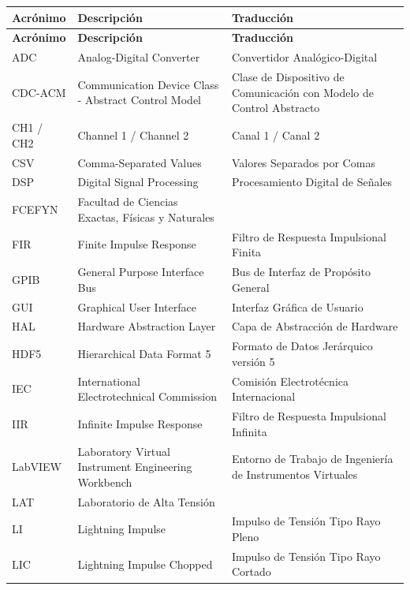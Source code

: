 \begin{xltabular}{\linewidth}{lXX}
    \toprule
    \textbf{Acrónimo} & \textbf{Descripción} & \textbf{Traducción} \\
    \midrule
    \endfirsthead

    \toprule
    \textbf{Acrónimo} & \textbf{Descripción} & \textbf{Traducción} \\
    \midrule
    \endhead

    \midrule
    \endfoot

    \bottomrule
    \endlastfoot

    ADC & Analog-Digital Converter & Convertidor Analógico-Digital \\
    CDC-ACM & Communication Device Class - Abstract Control Model & Clase de Dispositivo de Comunicación con Modelo de Control Abstracto \\
    CH1 / CH2 & Channel 1 / Channel 2 & Canal 1 / Canal 2 \\
    CSV & Comma-Separated Values & Valores Separados por Comas \\
    DSP & Digital Signal Processing & Procesamiento Digital de Señales \\
    FCEFYN & Facultad de Ciencias Exactas, Físicas y Naturales & \\
    FIR & Finite Impulse Response & Filtro de Respuesta Impulsional Finita \\
    GPIB & General Purpose Interface Bus & Bus de Interfaz de Propósito General \\
    GUI & Graphical User Interface & Interfaz Gráfica de Usuario \\
    HAL & Hardware Abstraction Layer & Capa de Abstracción de Hardware \\
    HDF5 & Hierarchical Data Format 5 & Formato de Datos Jerárquico versión 5 \\
    IEC & International Electrotechnical Commission & Comisión Electrotécnica Internacional \\
    IIR & Infinite Impulse Response & Filtro de Respuesta Impulsional Infinita \\
    LabVIEW & Laboratory Virtual Instrument Engineering Workbench & Entorno de Trabajo de Ingeniería de Instrumentos Virtuales \\
    LAT & Laboratorio de Alta Tensión & \\
    LI & Lightning Impulse & Impulso de Tensión Tipo Rayo Pleno \\
    LIC & Lightning Impulse Chopped & Impulso de Tensión Tipo Rayo Cortado \\

\end{xltabular}
